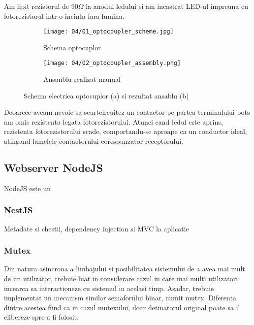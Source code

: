 Am lipit rezistorul de 90$\Omega$ la anodul ledului si am incastrat LED-ul impreuna cu fotorezistorul intr-o incinta fara lumina.

\begin{figure}[h!]
\centering
\begin{subfigure}{.5\textwidth}
  \centering
  \texttt{[image: 04/01\_optocoupler\_scheme.jpg]}
  \caption{Schema optocuplor \cite{OptocouplerCircuitsToday}}
  \label{fig:sub1}
\end{subfigure}%
\begin{subfigure}{.5\textwidth}
  \centering
  \texttt{[image: 04/02\_optocoupler\_assembly.png]}
  \caption{Ansanblu realizat manual}
  \label{fig:sub2}
\end{subfigure}
\caption{Schema electrica optocuplor (a) si rezultat ansablu (b)}
\label{fig:test}
\end{figure}

Deoarece aveam nevoie sa scurtcircuitez un contactor pe partea terminalului \acrshort{pots} am omis rezistenta legata fotorezistorului. Atunci cand ledul este aprins, rezistenta fotorezistorului scade, comportandu-se aproape ca un conductor ideal, atingand lamelele contactorului corespunzator receptorului.

\subsection {Webserver NodeJS}

NodeJS este un

\subsubsection {NestJS}

Metadate si chestii, dependency injection si MVC la aplicatie

\subsubsection {Mutex}

Din natura asincrona a limbajului si posibilitatea sistemului de a avea mai mult de un utilizator, trebuie luat in considerare cazul in care mai multi utilizatori incearca sa interactioneze cu sistemul in acelasi timp. Asadar, trebuie implementat un mecanism similar semaforului binar, numit mutex. Diferenta dintre acestea fiind ca in cazul mutexului, doar detinatorul original poate sa il elibereze spre a fi folosit.

